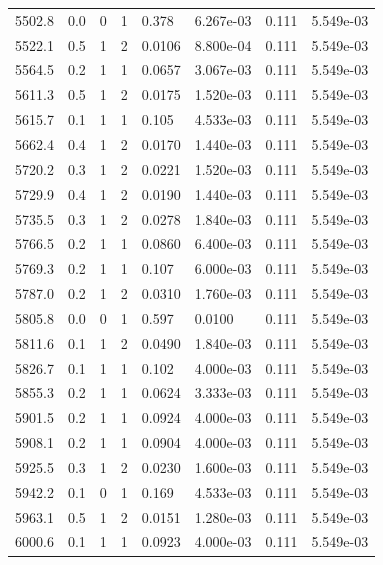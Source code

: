 \documentclass[preview]{standalone}
\begin{document}
{{{{{{{{{\begin{tabular}{L{1.2cm}C{1.2cm} C{0.3cm}C{0.5cm} C{1.4cm}C{1.4cm} C{1.4cm}C{1.4cm}}
  5502.8  &   0.0  & 0     &  1 &  0.378  & 6.267e-03  & 0.111 &  5.549e-03   \\ 
  5522.1  &   0.5  & 1     &  2 &  0.0106  & 8.800e-04  & 0.111 &  5.549e-03   \\ 
  5564.5  &   0.2  & 1     &  1 &  0.0657  & 3.067e-03  & 0.111 &  5.549e-03   \\ 
  5611.3  &   0.5  & 1     &  2 &  0.0175  & 1.520e-03  & 0.111 &  5.549e-03   \\ 
  5615.7  &   0.1  & 1     &  1 &  0.105  & 4.533e-03  & 0.111 &  5.549e-03   \\ 
  5662.4  &   0.4  & 1     &  2 &  0.0170  & 1.440e-03  & 0.111 &  5.549e-03   \\ 
  5720.2  &   0.3  & 1     &  2 &  0.0221  & 1.520e-03  & 0.111 &  5.549e-03   \\ 
  5729.9  &   0.4  & 1     &  2 &  0.0190  & 1.440e-03  & 0.111 &  5.549e-03   \\ 
  5735.5  &   0.3  & 1     &  2 &  0.0278  & 1.840e-03  & 0.111 &  5.549e-03   \\ 
  5766.5  &   0.2  & 1     &  1 &  0.0860  & 6.400e-03  & 0.111 &  5.549e-03   \\ 
  5769.3  &   0.2  & 1     &  1 &  0.107  & 6.000e-03  & 0.111 &  5.549e-03   \\ 
  5787.0  &   0.2  & 1     &  2 &  0.0310  & 1.760e-03  & 0.111 &  5.549e-03   \\ 
  5805.8  &   0.0  & 0     &  1 &  0.597  & 0.0100  & 0.111 &  5.549e-03   \\ 
  5811.6  &   0.1  & 1     &  2 &  0.0490  & 1.840e-03  & 0.111 &  5.549e-03   \\ 
  5826.7  &   0.1  & 1     &  1 &  0.102  & 4.000e-03  & 0.111 &  5.549e-03   \\ 
  5855.3  &   0.2  & 1     &  1 &  0.0624  & 3.333e-03  & 0.111 &  5.549e-03   \\ 
  5901.5  &   0.2  & 1     &  1 &  0.0924  & 4.000e-03  & 0.111 &  5.549e-03   \\ 
  5908.1  &   0.2  & 1     &  1 &  0.0904  & 4.000e-03  & 0.111 &  5.549e-03   \\ 
  5925.5  &   0.3  & 1     &  2 &  0.0230  & 1.600e-03  & 0.111 &  5.549e-03   \\ 
  5942.2  &   0.1  & 0     &  1 &  0.169  & 4.533e-03  & 0.111 &  5.549e-03   \\ 
  5963.1  &   0.5  & 1     &  2 &  0.0151  & 1.280e-03  & 0.111 &  5.549e-03   \\ 
  6000.6  &   0.1  & 1     &  1 &  0.0923  & 4.000e-03  & 0.111 &  5.549e-03   \\ 

\end{tabular}}}}}}}}}}
\end{document}

